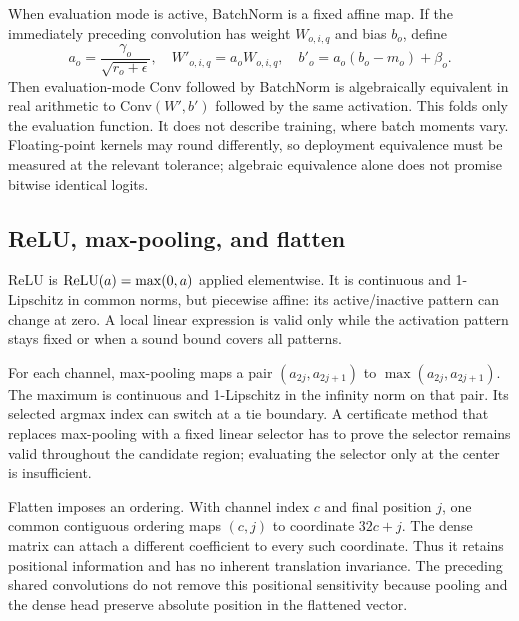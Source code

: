 \documentclass[11pt,a4paper]{article}
\begin{document}
When evaluation mode is active, BatchNorm is a fixed affine map. If the immediately preceding convolution has weight $W_{o,i,q}$ and bias $b_o$, define
\[
 a_o=\frac{\gamma_o}{\sqrt{r_o+\epsilon}},\quad W'_{o,i,q}=a_oW_{o,i,q},\quad b'_o=a_o(b_o-m_o)+\beta_o.
\]
Then evaluation-mode Conv followed by BatchNorm is algebraically equivalent in real arithmetic to Conv$(W',b')$ followed by the same activation. This folds only the evaluation function. It does not describe training, where batch moments vary. Floating-point kernels may round differently, so deployment equivalence must be measured at the relevant tolerance; algebraic equivalence alone does not promise bitwise identical logits.

\subsection{ReLU, max-pooling, and flatten}
ReLU is $\operatorname{ReLU}(a)=\max(0,a)$ applied elementwise. It is continuous and 1-Lipschitz in common norms, but piecewise affine: its active/inactive pattern can change at zero. A local linear expression is valid only while the activation pattern stays fixed or when a sound bound covers all patterns.

For each channel, max-pooling maps a pair $(a_{2j},a_{2j+1})$ to $\max(a_{2j},a_{2j+1})$. The maximum is continuous and 1-Lipschitz in the infinity norm on that pair. Its selected argmax index can switch at a tie boundary. A certificate method that replaces max-pooling with a fixed linear selector has to prove the selector remains valid throughout the candidate region; evaluating the selector only at the center is insufficient.

Flatten imposes an ordering. With channel index $c$ and final position $j$, one common contiguous ordering maps $(c,j)$ to coordinate $32c+j$. The dense matrix can attach a different coefficient to every such coordinate. Thus it retains positional information and has no inherent translation invariance. The preceding shared convolutions do not remove this positional sensitivity because pooling and the dense head preserve absolute position in the flattened vector.
\end{document}

